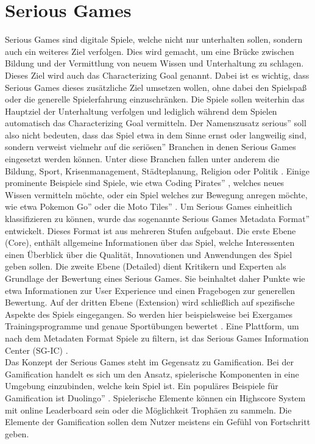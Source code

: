 \section{Serious Games}
Serious Games sind digitale Spiele, welche nicht nur unterhalten sollen, sondern auch ein weiteres Ziel verfolgen. Dies wird gemacht, um eine Brücke zwischen Bildung und der Vermittlung von neuem Wissen und Unterhaltung zu schlagen. Dieses Ziel wird auch das Characterizing Goal genannt. Dabei ist es wichtig, dass Serious Games dieses zusätzliche Ziel umsetzen wollen, ohne dabei den Spielspaß oder die generelle Spielerfahrung einzuschränken. Die Spiele sollen weiterhin das Hauptziel der Unterhaltung verfolgen und lediglich während dem Spielen automatisch das Characterizing Goal vermitteln. Der Namenszusatz \glqq serious'' soll also nicht bedeuten, dass das Spiel etwa in dem Sinne ernst oder langweilig sind, sondern verweist vielmehr auf die \glqq seriösen'' Branchen in denen Serious Games eingesetzt werden können. Unter diese Branchen fallen unter anderem die Bildung, Sport, Krisenmanagement, Städteplanung, Religion oder Politik \cite{gaiasg} . 
Einige prominente Beispiele sind Spiele, wie etwa \glqq Coding Pirates'' \cite{coding_game}, welches neues Wissen vermitteln möchte, oder ein Spiel welches zur Bewegung anregen möchte, wie etwa \glqq Pokemon Go''\cite{althoff2016influence} oder die \glqq Moto Tiles'' \cite{liu2018playful}. Um Serious Games einheitlich klassifizieren zu können, wurde das sogenannte \glqq Serious Games Metadata Format'' entwickelt. Dieses Format ist aus mehreren Stufen aufgebaut. Die erste Ebene (Core), enthält allgemeine Informationen über das Spiel, welche Interessenten einen Überblick über die Qualität, Innovationen und Anwendungen des Spiel geben sollen. Die zweite Ebene (Detailed) dient Kritikern und Experten als Grundlage der Bewertung eines Serious Games. Sie beinhaltet daher Punkte wie etwa Informationen zur User Experience und einen Fragebogen zur generellen Bewertung. Auf der dritten Ebene (Extension) wird schließlich auf spezifische Aspekte des Spiels eingegangen. So werden hier beispielsweise bei Exergames Trainingsprogramme und genaue Sportübungen bewertet \cite{gobel2011makes}. Eine Plattform, um nach dem Metadaten Format Spiele zu filtern, ist das Serious Games Information Center (SG-IC) \cite{sg_ic}. \\
Das Konzept der Serious Games steht im Gegensatz zu Gamification. Bei der Gamification handelt es sich um den Ansatz, spielerische Komponenten in eine Umgebung einzubinden, welche kein Spiel ist. Ein populäres Beispiele für Gamification ist \glqq Duolingo'' \cite{duolingo}. Spielerische Elemente können ein Highscore System mit online Leaderboard sein oder die Möglichkeit Trophäen zu sammeln. Die Elemente der Gamification sollen dem Nutzer meistens ein Gefühl von Fortschritt geben. 

